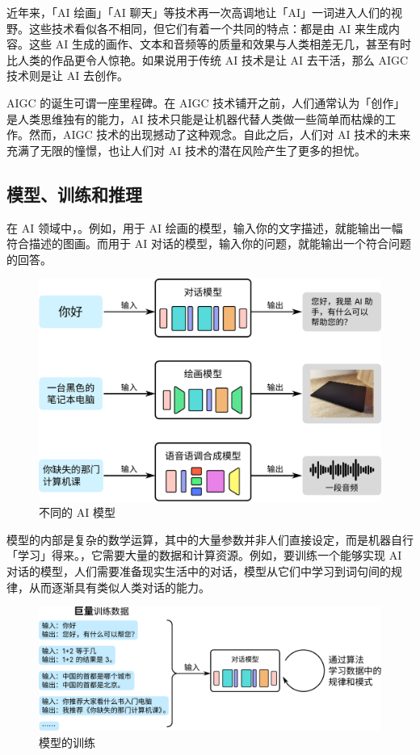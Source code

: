 近年来，「AI 绘画」「AI 聊天」等技术再一次高调地让「AI」一词进入人们的视野。这些技术看似各不相同，但它们有着一个共同的特点：都是由 AI 来生成内容。这些 AI 生成的画作、文本和音频等的质量和效果与人类相差无几，甚至有时比人类的作品更令人惊艳。如果说用于传统 AI 技术是让 AI 去干活，那么 AIGC 技术则是让 AI 去创作。

AIGC 的诞生可谓一座里程碑。在 AIGC 技术铺开之前，人们通常认为「创作」是人类思维独有的能力，AI 技术只能是让机器代替人类做一些简单而枯燥的工作。然而，AIGC 技术的出现撼动了这种观念。自此之后，人们对 AI 技术的未来充满了无限的憧憬，也让人们对 AI 技术的潜在风险产生了更多的担忧。

\subsection{模型、训练和推理}

在 AI 领域中，。例如，用于 AI 绘画的模型，输入你的文字描述，就能输出一幅符合描述的图画。而用于 AI 对话的模型，输入你的问题，就能输出一个符合问题的回答。

\begin{figure}[htb!]
  \centering
  \includegraphics[width=.65\textwidth]{assets/surpass/AI_models.pdf}
  \caption{不同的 AI 模型}
  \label{fig:AI_models}
\end{figure}

模型的内部是复杂的数学运算，其中的大量参数并非人们直接设定，而是机器自行「学习」得来。，它需要大量的数据和计算资源。例如，要训练一个能够实现 AI 对话的模型，人们需要准备现实生活中的对话，模型从它们中学习到词句间的规律，从而逐渐具有类似人类对话的能力。

\begin{figure}[htb!]
  \centering
  \includegraphics[width=.9\textwidth]{assets/surpass/Model_training.pdf}
  \caption{模型的训练}
  \label{fig:Model_training}
\end{figure}

